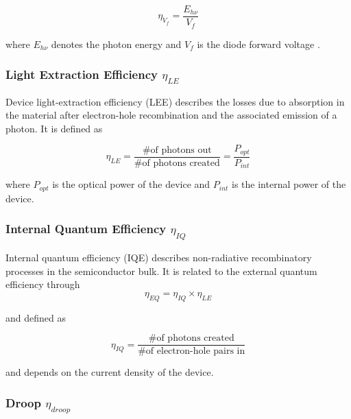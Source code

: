 \documentclass[twoside,twocolumn,9pt]{article}
\begin{document}
\begin{equation}
    \eta_{V_f} = \frac{E_{h\nu}}{V_f}
\end{equation}

where $E_{h\nu}$ denotes the photon energy and $V_f$ is the diode forward voltage \cite{schubert2018light}\cite{tsao2010solid}.

\subsubsection{Light Extraction Efficiency $\eta_{LE}$}

Device light-extraction efficiency (LEE) describes the  losses due to absorption in the material after electron-hole recombination and the associated emission of a photon. It is defined as

\begin{equation}
    \eta_{LE}=\frac{\text{\# of photons out}}{\text{\# of photons created}} = \frac{P_{opt}}{P_{int}}
\end{equation}

where $P_{opt}$ is the optical power of the device and $P_{int}$ is the internal power of the device\cite{schubert2018light}\cite{tsao2010solid}.

\subsubsection{Internal Quantum Efficiency $\eta_{IQ}$}

Internal quantum efficiency (IQE) describes non-radiative recombinatory processes in the semiconductor bulk. It is related to the external quantum efficiency through
\begin{equation}
\label{eqn:ieq-eqe}
    \eta_{EQ} = \eta_{IQ} \times \eta_{LE}
\end{equation}

and defined as

\begin{equation}
    \eta_{IQ} = \frac{\# \text{of photons created}}{\# \text{of electron-hole pairs in}}
\end{equation}

and depends on the current density of the device\cite{schubert2018light}\cite{tsao2010solid}. 

\subsubsection{Droop $\eta_{droop}$}
\end{document}
